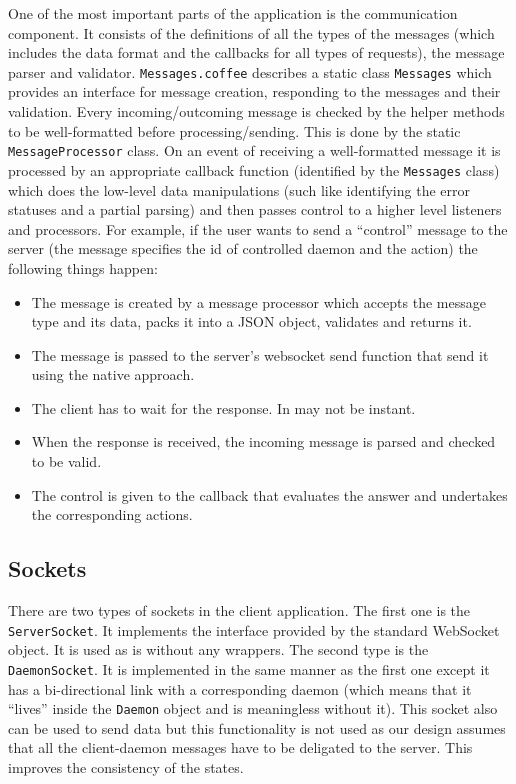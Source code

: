 \documentclass{l3proj}
\begin{document}
One of the most important parts of the application is the communication component. It consists of the definitions of all the types of the messages (which includes the data format and the callbacks for all types of requests), the message parser and validator. \texttt{Messages.coffee} describes a static class \texttt{Messages} which provides an interface for message creation, responding to the messages and their validation. Every incoming/outcoming message is checked by the helper methods to be well-formatted before processing/sending. This is done by the static \texttt{MessageProcessor} class. On an event of receiving a well-formatted message it is processed by an appropriate callback function (identified by the \texttt{Messages} class) which does the low-level data manipulations (such like identifying the error statuses and a partial parsing) and then passes control to a higher level listeners and processors. For example, if the user wants to send a ``control'' message to the server (the message specifies the id of controlled daemon and the action) the following things happen:
\begin{itemize}
  \item The message is created by a message processor which accepts the message type and its data, packs it into a JSON object, validates and returns it.
  \item The message is passed to the server's websocket send function that send it using the native approach.
  \item The client has to wait for the response. In may not be instant.
  \item When the response is received, the incoming message is parsed and checked to be valid.
  \item The control is given to the callback that evaluates the answer and undertakes the corresponding actions.
\end{itemize}

\subsection{Sockets}

There are two types of sockets in the client application. The first one is the \texttt{ServerSocket}. It implements the interface provided by the standard WebSocket object. It is used as is without any wrappers. The second type is the \texttt{DaemonSocket}. It is implemented in the same manner as the first one except it has a bi-directional link with a corresponding daemon (which means that it ``lives'' inside the \texttt{Daemon} object and is meaningless without it). This socket also can be used to send data but this functionality is not used as our design assumes that all the client-daemon messages have to be deligated to the server. This improves the consistency of the states.
\end{document}
